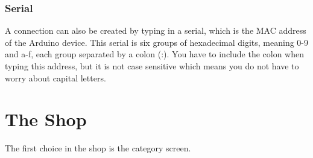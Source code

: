 			\subsubsection{Serial}
				A connection can also be created by typing in a serial, which is the MAC address of the Arduino device. This serial is six groups of hexadecimal digits, meaning 0-9 and a-f, each group separated by a colon (:). You have to include the colon when typing this address, but it is not case sensitive which means you do not have to worry about capital letters.\\

	\section{The Shop}
		The first choice in the shop is the category screen.\\
